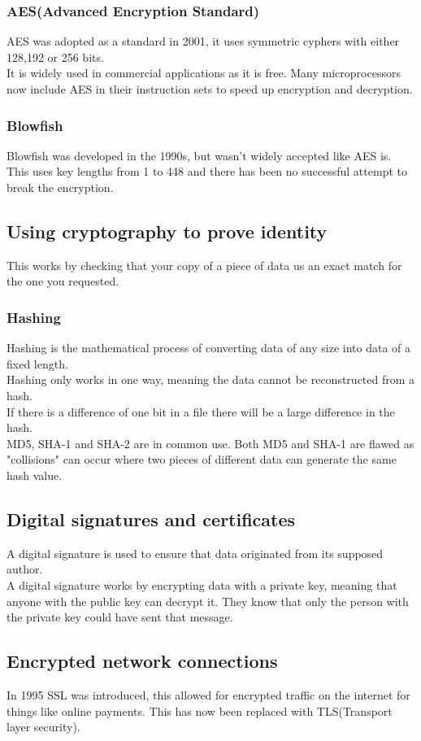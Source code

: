 \documentclass{article}[18pt]
\begin{document}
\subsubsection{AES(Advanced Encryption Standard)}
AES was adopted as a standard in 2001, it uses symmetric cyphers with either 128,192 or 256 bits.\\
It is widely used in commercial applications as it is free. Many microprocessors now include AES in their instruction sets to speed up encryption and decryption.
\subsubsection{Blowfish}
Blowfish was developed in the 1990s, but wasn't widely accepted like AES is. This uses key lengths from 1 to 448 and there has been no successful attempt to break the encryption.
\subsection{Using cryptography to prove identity}
This works by checking that your copy of a piece of data us an exact match for the one you requested.
\subsubsection{Hashing}
Hashing is the mathematical process of converting data of any size into data of a fixed length.\\
Hashing only works in one way, meaning the data cannot be reconstructed from a hash.\\
If there is a difference of one bit in a file there will be a large difference in the hash.\\
MD5, SHA-1 and SHA-2 are in common use. Both MD5 and SHA-1 are flawed as "collisions" can occur where two pieces of different data can generate the same hash value.
\subsection{Digital signatures and certificates}
A digital signature is used to ensure that data originated from its supposed author.\\
A digital signature works by encrypting data with a private key, meaning that anyone with the public key can decrypt it. They know that only the person with the private key could have sent that message.
\subsection{Encrypted network connections}
In 1995 SSL was introduced, this allowed for encrypted traffic on the internet for things like online payments. This has now been replaced with TLS(Transport layer security).
\end{document}
